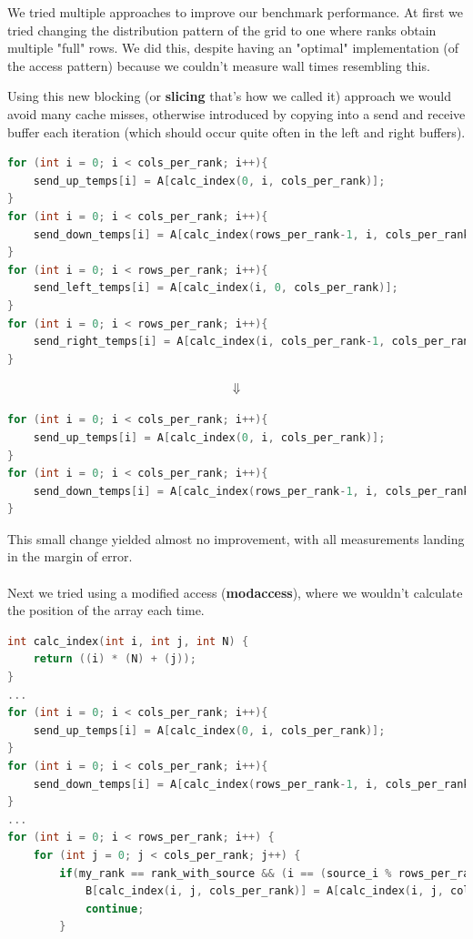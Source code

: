 \documentclass[UTF-8]{article}
\begin{document}
\begin{itemize}
    	We tried multiple approaches to improve our benchmark performance. At first we tried changing the distribution pattern of the grid to one where ranks obtain multiple "full" rows. We did this, despite having an "optimal" implementation (of the access pattern) because we couldn't measure wall times resembling this.
    	
    	Using this new blocking (or \textbf{slicing} that's how we called it) approach we would avoid many cache misses, otherwise introduced by copying into a send and receive buffer each iteration (which should occur quite often in the left and right buffers).
    	
    	\begin{lstlisting}[language=c]
for (int i = 0; i < cols_per_rank; i++){
	send_up_temps[i] = A[calc_index(0, i, cols_per_rank)];
}
for (int i = 0; i < cols_per_rank; i++){
	send_down_temps[i] = A[calc_index(rows_per_rank-1, i, cols_per_rank)];
}
for (int i = 0; i < rows_per_rank; i++){
	send_left_temps[i] = A[calc_index(i, 0, cols_per_rank)];
}
for (int i = 0; i < rows_per_rank; i++){
	send_right_temps[i] = A[calc_index(i, cols_per_rank-1, cols_per_rank)];
}\end{lstlisting}
\begin{align*}
	\Downarrow
\end{align*}
\begin{lstlisting}[language=c]
for (int i = 0; i < cols_per_rank; i++){
	send_up_temps[i] = A[calc_index(0, i, cols_per_rank)];
}
for (int i = 0; i < cols_per_rank; i++){
	send_down_temps[i] = A[calc_index(rows_per_rank-1, i, cols_per_rank)];
}
\end{lstlisting}

	This small change yielded almost no improvement, with all measurements landing in the margin of error.
	\\\\
	Next we tried using a modified access (\textbf{modaccess}), where we wouldn't calculate the position of the array each time.
	
	\begin{lstlisting}[language=c]
int calc_index(int i, int j, int N) {
	return ((i) * (N) + (j));
}
...
for (int i = 0; i < cols_per_rank; i++){
	send_up_temps[i] = A[calc_index(0, i, cols_per_rank)];
}
for (int i = 0; i < cols_per_rank; i++){
	send_down_temps[i] = A[calc_index(rows_per_rank-1, i, cols_per_rank)];
}
...
for (int i = 0; i < rows_per_rank; i++) {
	for (int j = 0; j < cols_per_rank; j++) {
		if(my_rank == rank_with_source && (i == (source_i % rows_per_rank)) && (j == (source_j % cols_per_rank))){
			B[calc_index(i, j, cols_per_rank)] = A[calc_index(i, j, cols_per_rank)];
			continue;
		}
		

\end{lstlisting}
\end{itemize}
\end{document}
